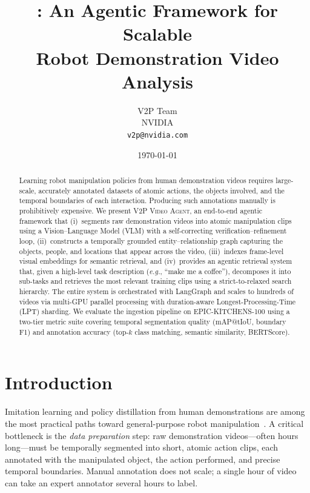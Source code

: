 \documentclass[10pt,twocolumn]{article}
\title{\sys: An Agentic Framework for Scalable\\
       Robot Demonstration Video Analysis}
\author{
  V2P Team \\
  NVIDIA \\
  \texttt{v2p@nvidia.com}
}
\date{\today}
\newcommand{\eg}{\textit{e.g.}}
\newcommand{\sys}{\textsc{V2P Video Agent}}
\begin{document}
\maketitle

\begin{abstract}
Learning robot manipulation policies from human demonstration videos
requires large-scale, accurately annotated datasets of atomic actions,
the objects involved, and the temporal boundaries of each interaction.
Producing such annotations manually is prohibitively expensive.
We present \sys{}, an end-to-end agentic framework that
(i)~segments raw demonstration videos into atomic manipulation clips
  using a Vision--Language Model (VLM) with a self-correcting
  verification--refinement loop,
(ii)~constructs a temporally grounded entity--relationship graph
  capturing the objects, people, and locations that appear across the
  video,
(iii)~indexes frame-level visual embeddings for semantic retrieval, and
(iv)~provides an agentic retrieval system that, given a high-level
  task description (\eg, ``make me a coffee''), decomposes it into
  sub-tasks and retrieves the most relevant training clips using a
  strict-to-relaxed search hierarchy.
The entire system is orchestrated with LangGraph and scales to
hundreds of videos via multi-GPU parallel processing with
duration-aware Longest-Processing-Time (LPT) sharding.
We evaluate the ingestion pipeline on EPIC-KITCHENS-100 using a
two-tier metric suite covering temporal segmentation quality
(mAP@tIoU, boundary F1) and annotation accuracy (top-$k$ class
matching, semantic similarity, BERTScore).
\end{abstract}

\section{Introduction}\label{sec:intro}

Imitation learning and policy distillation from human demonstrations
are among the most practical paths toward general-purpose robot
manipulation~\cite{chi2023diffusion,zhao2023aloha,brohan2023rt2}.
A critical bottleneck is the \emph{data preparation} step:
raw demonstration videos---often hours long---must be temporally
segmented into short, atomic action clips, each annotated with the
manipulated object, the action performed, and precise temporal
boundaries.
Manual annotation does not scale; a single hour of video can take
an expert annotator several hours to label.
\end{document}
